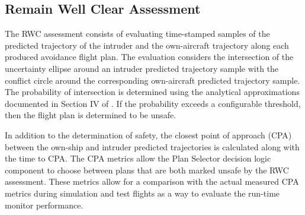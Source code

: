 \subsection{Remain Well Clear Assessment} 
The RWC assessment consists of evaluating time-stamped samples of the predicted trajectory of the intruder and the own-aircraft trajectory along each produced avoidance flight plan. The evaluation considers the intersection of the uncertainty ellipse around an intruder predicted trajectory sample with the conflict circle around the corresponding own-aircraft predicted trajectory sample. The probability of intersection is determined using the analytical approximations documented in Section IV of \cite{prob_conflict_detection}. If the probability exceeds a configurable threshold, then the flight plan is determined to be unsafe. 

In addition to the determination of safety, the closest point of approach (CPA) between the own-ship and intruder predicted trajectories is calculated along with the time to CPA. The CPA metrics allow the Plan Selector decision logic component to choose between plans that are both marked unsafe by the RWC assessment. These metrics allow for a comparison with the actual measured CPA metrics during simulation and test flights as a way to evaluate the run-time monitor performance.

